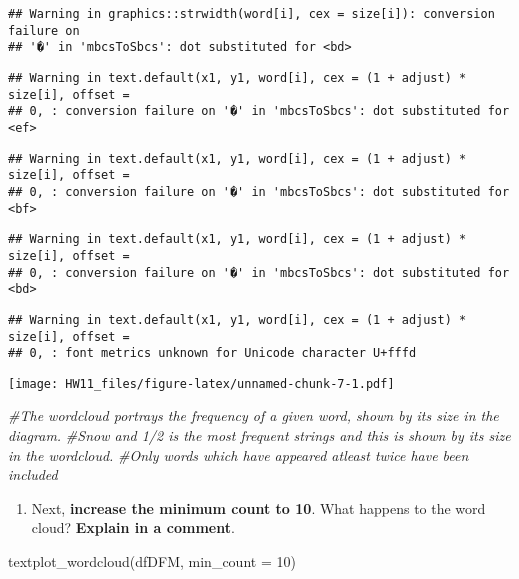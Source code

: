 \documentclass[
]{article}
\newenvironment{Shaded}{\begin{snugshade}}{\end{snugshade}}
\newcommand{\AttributeTok}[1]{\textcolor[rgb]{0.77,0.63,0.00}{#1}}
\newcommand{\CommentTok}[1]{\textcolor[rgb]{0.56,0.35,0.01}{\textit{#1}}}
\newcommand{\DecValTok}[1]{\textcolor[rgb]{0.00,0.00,0.81}{#1}}
\newcommand{\FunctionTok}[1]{\textcolor[rgb]{0.00,0.00,0.00}{#1}}
\newcommand{\NormalTok}[1]{#1}
\providecommand{\tightlist}{%
  \setlength{\itemsep}{0pt}\setlength{\parskip}{0pt}}
\begin{document}
\begin{verbatim}
## Warning in graphics::strwidth(word[i], cex = size[i]): conversion failure on
## '�' in 'mbcsToSbcs': dot substituted for <bd>
\end{verbatim}

\begin{verbatim}
## Warning in text.default(x1, y1, word[i], cex = (1 + adjust) * size[i], offset =
## 0, : conversion failure on '�' in 'mbcsToSbcs': dot substituted for <ef>
\end{verbatim}

\begin{verbatim}
## Warning in text.default(x1, y1, word[i], cex = (1 + adjust) * size[i], offset =
## 0, : conversion failure on '�' in 'mbcsToSbcs': dot substituted for <bf>
\end{verbatim}

\begin{verbatim}
## Warning in text.default(x1, y1, word[i], cex = (1 + adjust) * size[i], offset =
## 0, : conversion failure on '�' in 'mbcsToSbcs': dot substituted for <bd>
\end{verbatim}

\begin{verbatim}
## Warning in text.default(x1, y1, word[i], cex = (1 + adjust) * size[i], offset =
## 0, : font metrics unknown for Unicode character U+fffd
\end{verbatim}

\texttt{[image: HW11\_files/figure-latex/unnamed-chunk-7-1.pdf]}

\begin{Shaded}
\begin{Highlighting}[]
\CommentTok{\#The wordcloud portrays the frequency of a given word, shown by its size in the diagram. }
\CommentTok{\#Snow and \textquotesingle{}1/2\textquotesingle{} is the most frequent strings and this is shown by its size in the wordcloud. }
\CommentTok{\#Only words which have appeared atleast twice have been included}
\end{Highlighting}
\end{Shaded}

\begin{enumerate}
\def\labelenumi{\Alph{enumi}.}
\setcounter{enumi}{5}
\tightlist
\item
  Next, \textbf{increase the minimum count to 10}. What happens to the
  word cloud? \textbf{Explain in a comment}.
\end{enumerate}

\begin{Shaded}
\begin{Highlighting}[]
\FunctionTok{textplot\_wordcloud}\NormalTok{(dfDFM, }\AttributeTok{min\_count =} \DecValTok{10}\NormalTok{)}
\end{Highlighting}
\end{Shaded}
\end{document}
